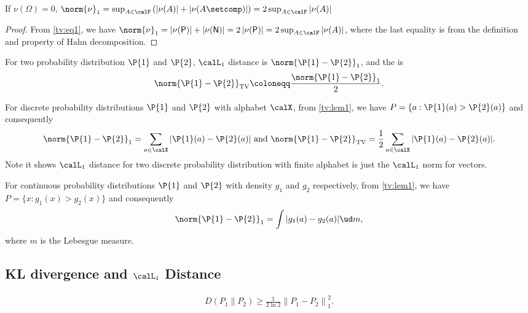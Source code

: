 \documentclass{article}
\newcommand{\TV}[1]{\norm{#1}_{\textnormal{TV}}}
\newcommand{\one}[1]{\norm{#1}_{1}}
\begin{document}
\begin{lema}\label{tv:lem1} %
If $\nu(\Omega)=0$, $\one{\nu}  = \sup_{A\in \calF} \left(\left| \nu(A)\right| + \left| \nu(A\setcomp)\right|\right) = 2\sup_{A\in \calF} \left| \nu(A)\right|$
\end{lema}
\begin{proof}
From \cref{tv:eq1}, we have $\one{\nu}  = \left| \nu(\mathsf{P})\right| + \left| \nu(\mathsf{N})\right| = 2\left| \nu(\mathsf{P})\right| = 2\sup_{A\in \calF} \left| \nu(A)\right|$, where the last equality is from the definition and property of Hahn decomposition.
\end{proof}


\begin{defa}{}\label{tv:df1}
For two probability distribution $\P{1}$ and $\P{2}$, $\calL_1$ distance is $\one{\P{1}-\P{2}}$, and the  is $$\TV{\P{1}-\P{2}}\coloneqq \frac{\one{\P{1}-\P{2}}}{2}.$$
\end{defa}

\begin{rema}\label{tv:rem2}
For discrete probability distributions $\P{1}$ and $\P{2}$ with alphabet $\calX$, from \cref{tv:lem1}, we have $P=\{a:\P{1}(a)>\P{2}(a)\}$ and consequently $$\one{\P{1}-\P{2}}=\sum_{a\in\calX} |\P{1}(a)-\P{2}(a)|\text{ and } \TV{\P{1}-\P{2}}=\frac{1}{2}\sum_{a\in\calX} |\P{1}(a)-\P{2}(a)|.$$ Note it shows $\calL_1$ distance for two discrete probability distribution with finite alphabet is just the $\calL_1$ norm for vectors.

For continuous probability distributions $\P{1}$ and $\P{2}$ with density $g_1$ and $g_2$ respectively, from \cref{tv:lem1}, we have $P=\{x:g_1(x)>g_2(x)\}$ and consequently $$\one{\P{1}-\P{2}}=\int |g_{1}(a)-g_{2}(a)| \ud m,$$
where $m$ is the Lebesgue measure.

\blue{[need update $\|P-Q\|_{ TV } = \inf \{ P \{X \neq Y\}: X \sim P, Y \sim Q\}$]}
\end{rema}

\subsection{KL divergence and $\calL_1$ Distance}

\begin{lema}\label{tv:lem2}
\begin{align*}
D\left(P_{1} \| P_{2}\right) \geq \frac{1}{2 \ln 2}\left\|P_{1}-P_{2}\right\|_{1}^{2}.
\end{align*}
\end{lema}
\end{document}
